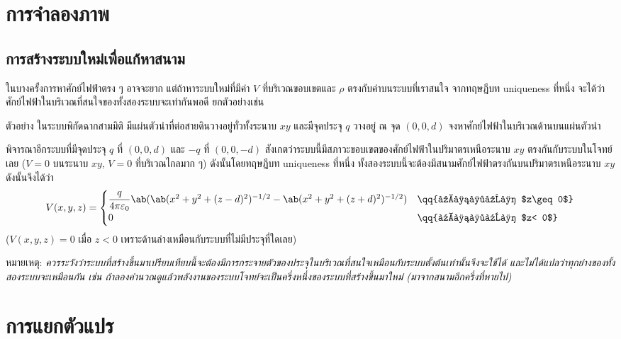\section{การจำลองภาพ}
\subsection{การสร้างระบบใหม่เพื่อแก้หาสนาม}
ในบางครั้งการหาศักย์ไฟฟ้าตรง ๆ อาจจะยาก แต่ถ้าหาระบบใหม่ที่มีค่า $V$ ที่บริเวณขอบเขตและ $\rho$ ตรงกับค่าบนระบบที่เราสนใจ จากทฤษฎีบท uniqueness ที่หนึ่ง จะได้ว่าศักย์ไฟฟ้าในบริเวณที่สนใจของทั้งสองระบบจะเท่ากันพอดี ยกตัวอย่างเช่น

\begin{corbox}{ตัวอย่าง}
    ในระบบพิกัดฉากสามมิติ มีแผ่นตัวนำที่ต่อสายดินวางอยู่ทั่วทั้งระนาบ $xy$ และมีจุดประจุ $q$ วางอยู่ ณ จุด $(0,0,d)$ จงหาศักย์ไฟฟ้าในบริเวณด้านบนแผ่นตัวนำ
\end{corbox}
\begin{soln}
    พิจารณาอีกระบบที่มีจุดประจุ $q$ ที่ $(0,0,d)$ และ $-q$ ที่ $(0,0,-d)$ สังเกตว่าระบบนี้มีสภาวะขอบเขตของศักย์ไฟฟ้าในปริมาตรเหนือระนาบ $xy$ ตรงกันกับระบบในโจทย์เลย ($V=0$ บนระนาบ $xy$, $V=0$ ที่บริเวณไกลมาก ๆ) ดังนั้นโดยทฤษฎีบท uniqueness ที่หนึ่ง ทั้งสองระบบนี้จะต้องมีสนามศักย์ไฟฟ้าตรงกันบนปริมาตรเหนือระนาบ $xy$\\
    ดังนั้นจึงได้ว่า
    \[V(x,y,z)=\begin{cases}
        \dfrac{q}{4\pi\eps_0}\ab(\ab(x^2+y^2+(z-d)^2)^{-1/2}-\ab(x^2+y^2+(z+d)^2)^{-1/2})&\qq{เมื่อ $z\geq0$}\\
        0&\qq{เมื่อ $z< 0$}
    \end{cases}\]
    ($V(x,y,z)=0$ เมื่อ $z<0$ เพราะด้านล่างเหมือนกับระบบที่ไม่มีประจุที่ใดเลย)
\end{soln}
หมายเหตุ: \emph{ควรระวังว่าระบบที่สร้างขึ้นมาเปรียบเทียบนี้จะต้องมีการกระจายตัวของประจุในบริเวณที่สนใจเหมือนกับระบบตั้งต้นเท่านั้นจึงจะใช้ได้ และไม่ได้แปลว่าทุกย่างของทั้งสองระบบจะเหมือนกัน เช่น ถ้าลองคำนวณดูแล้วพลังงานของระบบโจทย์จะเป็นครึ่งหนึ่งของระบบที่สร้างขึ้นมาใหม่ (มาจากสนามอีกครึ่งที่หายไป)}
\section{การแยกตัวแปร}
